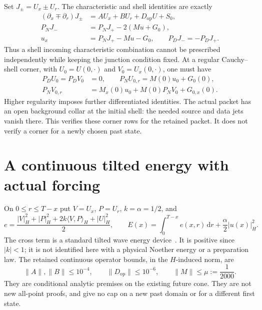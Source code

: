 \documentclass[11pt]{article}
\newcommand{\dd}{\,\mathrm d}
\newcommand{\PN}{P_{\!N}}
\newcommand{\PD}{P_{\!D}}
\newcommand{\ip}[2]{\langle #1,#2\rangle_H}
\newcommand{\norm}[1]{\lvert #1\rvert_H}
\newcommand{\Dmat}{D_{\mathrm{op}}}
\begin{document}
Set $J_\pm=U_x\pm U_r$. The characteristic and shell identities are exactly
\begin{equation}
\begin{aligned}
 (\partial_x\mp\partial_r)J_\pm&=A U_x+B U_r+\Dmat U+S_0,\\
 \PN J_-&=\PN J_+-2(Mu+G_0),\\
 u_x&=\PN J_+-Mu-G_0,\qquad \PD J_-=-\PD J_+.
\end{aligned}
\label{eq:char}
\end{equation}
Thus a shell incoming characteristic combination cannot be prescribed
independently while keeping the junction condition fixed.
At a regular Cauchy--shell corner, with $U_0=U(0,\cdot)$ and
$V_0=U_x(0,\cdot)$, one must have
\begin{equation}
\begin{aligned}
 \PD U_0=\PD V_0&=0,\qquad
 \PN U_{0,r}=M(0)u_0+G_0(0),\\
 \PN V_{0,r}&=M_x(0)u_0+M(0)\PN V_0+G_{0,x}(0).
\end{aligned}
\label{eq:corner}
\end{equation}
Higher regularity imposes further differentiated identities. The actual
packet has an open background collar at the initial shell: the needed
source and data jets vanish there. This verifies these corner rows for the
retained packet. It does not verify a corner for a newly chosen past state.

\section{A continuous tilted energy with actual forcing}
\label{sec:energy}
On $0\le r\le T-x$ put $V=U_x$, $P=U_r$, $k=\alpha=1/2$, and
\begin{equation}
 e=\frac{\norm{V}^2+\norm{P}^2+2k\ip{V}{P}+\norm{U}^2}{2},
 \qquad
 E(x)=\int_0^{T-x}e(x,r)\dd r+\frac{\alpha}{2}\norm{u(x)}^2.
 \label{eq:energy}
\end{equation}
The cross term is a standard tilted wave energy device~\cite{wave}.
It is positive since $|k|<1$; it is not identified here with a physical
Noether energy or a preparation law.
The retained continuous operator bounds, in the $H$-induced norm, are
\begin{equation}
 \|A\|,\|B\|\le10^{-4},\qquad
 \|\Dmat\|\le10^{-6},\qquad \|M\|\le\mu:=\frac1{2000}.
 \label{eq:caps}
\end{equation}
They are conditional analytic premises on the existing future cone.
They are not new all-point proofs, and give no cap on a new past domain
or for a different first state.
\end{document}
